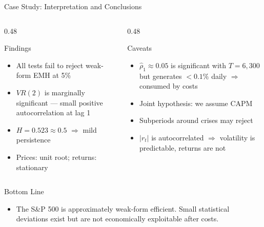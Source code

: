 \documentclass[9pt, aspectratio=169, t]{beamer}
\theoremstyle{definition}
\newenvironment{cminipage}[1]{%
    \par\noindent\hfill\begin{minipage}{#1}\ignorespaces
}{%
    \end{minipage}\hfill\null\par
}
\begin{document}
\begin{frame}{Case Study: Interpretation and Conclusions}
\begin{cminipage}{0.95\textwidth}
\small
\begin{columns}[T]
\begin{column}{0.48\textwidth}
\begin{block}{Findings}
\begin{itemize}\setlength{\itemsep}{0pt}
    \item All tests fail to reject weak-form EMH at 5\%
    \item $VR(2)$ is marginally significant --- small positive autocorrelation at lag 1
    \item $H = 0.523 \approx 0.5$ $\Rightarrow$ mild persistence
    \item Prices: unit root; returns: stationary
\end{itemize}
\end{block}
\end{column}
\begin{column}{0.48\textwidth}
\begin{alertblock}{Caveats}
\begin{itemize}\setlength{\itemsep}{0pt}
    \item $\hat{\rho}_1 \approx 0.05$ is significant with $T = 6{,}300$ but generates $< 0.1\%$ daily $\Rightarrow$ consumed by costs
    \item Joint hypothesis: we assume CAPM
    \item Subperiods around crises may reject
    \item $|r_t|$ is autocorrelated $\Rightarrow$ volatility is predictable, returns are not
\end{itemize}
\end{alertblock}
\end{column}
\end{columns}

\vspace{0.1cm}
\begin{exampleblock}{Bottom Line}
\begin{itemize}\setlength{\itemsep}{0pt}
    \item The S\&P 500 is approximately weak-form efficient. Small statistical deviations exist but are not economically exploitable after costs.
\end{itemize}
\end{exampleblock}
\end{cminipage}
\end{frame}
\end{document}
